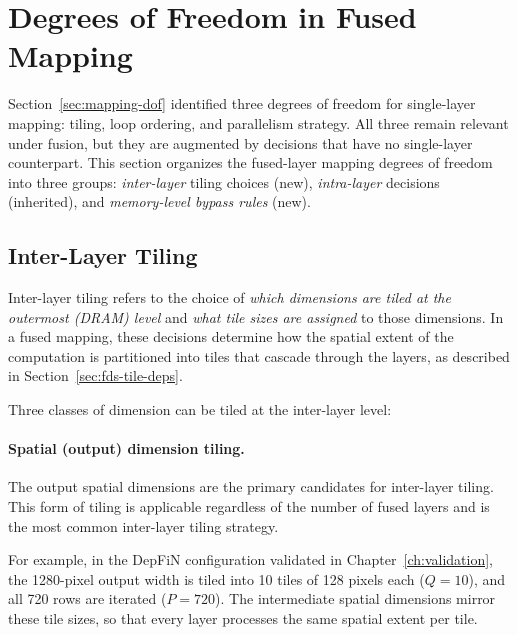 \section{Degrees of Freedom in Fused Mapping}
\label{sec:fds-dof}

Section~\ref{sec:mapping-dof} identified three degrees of freedom
for single-layer mapping: tiling, loop ordering, and parallelism
strategy.
All three remain relevant under fusion, but they are augmented by
decisions that have no single-layer counterpart.
This section organizes the fused-layer mapping degrees of freedom into
three groups: \emph{inter-layer} tiling choices (new), \emph{intra-layer}
decisions (inherited), and \emph{memory-level bypass rules} (new).


\subsection{Inter-Layer Tiling}
\label{sec:fds-inter-tiling}

Inter-layer tiling refers to the choice of \emph{which dimensions are
tiled at the outermost (DRAM) level} and \emph{what tile sizes are
assigned} to those dimensions.
In a fused mapping, these decisions determine how the spatial extent
of the computation is partitioned into tiles that cascade through the
layers, as described in Section~\ref{sec:fds-tile-deps}.

Three classes of dimension can be tiled at the inter-layer level:

\paragraph{Spatial (output) dimension tiling.}
The output spatial dimensions are the primary candidates
for inter-layer tiling.
This form of tiling is applicable regardless of the number of fused
layers and is the most common inter-layer tiling strategy.

For example, in the DepFiN configuration validated in
Chapter~\ref{ch:validation}, the 1280-pixel output width is tiled into
10 tiles of 128 pixels each ($Q = 10$), and all 720 rows are
iterated ($P = 720$).
The intermediate spatial dimensions mirror these tile sizes, so that every layer processes the same
spatial extent per tile.

